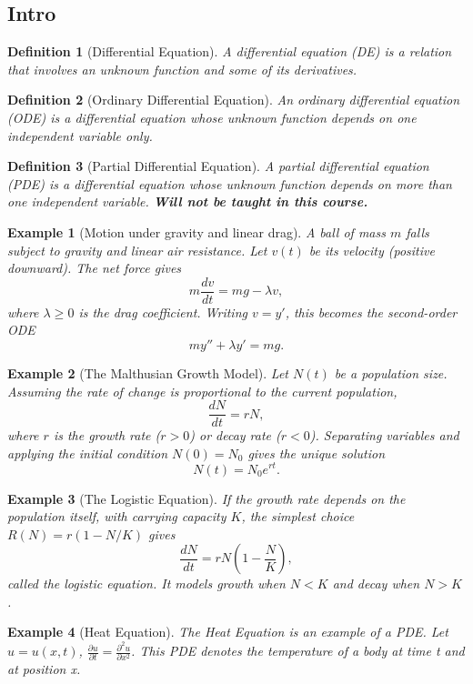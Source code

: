\documentclass{article}
\newtheorem{definition}{Definition}
\newtheorem*{example}{Example}
\begin{document}
\subsection{Intro}
\begin{definition}[Differential Equation]
    A differential equation (DE) is a relation that involves an unknown function and some of its derivatives.
\end{definition}
\begin{definition}[Ordinary Differential Equation]
    An ordinary differential equation (ODE) is a differential equation whose unknown function depends on one independent variable only.
\end{definition}
\begin{definition}[Partial Differential Equation]
    A partial differential equation (PDE) is a differential equation whose unknown function depends on more than one independent variable. \textbf{Will not be taught in this course.}
\end{definition}

\begin{example}[Motion under gravity and linear drag]
    A ball of mass $m$ falls subject to gravity and linear air resistance. Let $v(t)$ be its velocity (positive downward). The net force gives
    \[m\frac{dv}{dt} = mg - \lambda v,\]
    where $\lambda \geq 0$ is the drag coefficient. Writing $v = y'$, this becomes the second-order ODE
    \[my'' + \lambda y' = mg.\]
\end{example}
\begin{example}[The Malthusian Growth Model]
    Let $N(t)$ be a population size. Assuming the rate of change is 
    proportional to the current population,
    \[\frac{dN}{dt} = rN,\]
    where $r$ is the growth rate ($r>0$) or decay rate ($r<0$). Separating variables and applying the initial condition $N(0)=N_0$ gives the unique solution
    \[N(t) = N_0 e^{rt}.\]
\end{example}
\begin{example}[The Logistic Equation]
    If the growth rate depends on the population itself, with carrying capacity $K$, the simplest choice $R(N) = r(1-N/K)$ gives
    \[\frac{dN}{dt} = rN\!\left(1 - \frac{N}{K}\right),\]
    called the logistic equation. It models growth when $N < K$ and decay when $N > K$.
\end{example}
\begin{example}[Heat Equation]
    The Heat Equation is an example of a PDE. Let \(u = u(x,t)\), \(\frac{\partial u}{\partial t} = \frac{\partial^2 u}{\partial x^2}\). This PDE denotes the temperature of a body at time t and at position x.
\end{example}
\end{document}
